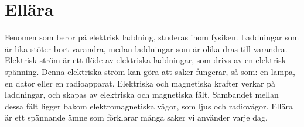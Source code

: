 \chapter{Ellära}
\label{ch:ellaera}

Fenomen som beror på elektrisk laddning, studeras inom fysiken.
Laddningar som är lika stöter bort varandra, medan laddningar som är olika dras
till varandra.
Elektrisk ström är ett flöde av elektriska laddningar, som drivs av en elektrisk
spänning.
Denna elektriska ström kan göra att saker fungerar, så som: en lampa, en dator
eller en radioapparat.
Elektriska och magnetiska krafter verkar på laddningar, och skapas av elektriska
och magnetiska fält.
Sambandet mellan dessa fält ligger bakom elektromagnetiska vågor, som ljus och
radiovågor.
Ellära är ett spännande ämne som förklarar många saker vi använder varje dag.
